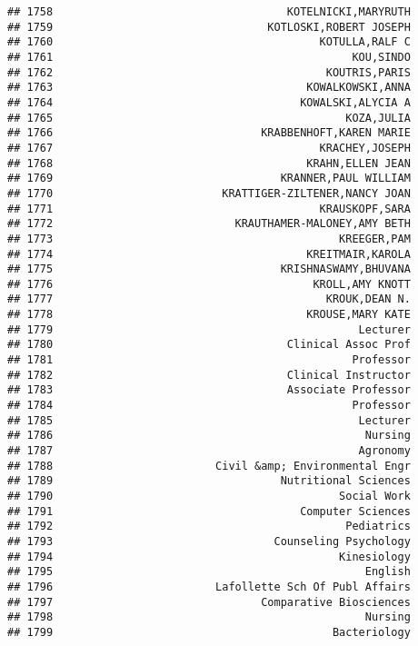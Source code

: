 \documentclass[
]{article}
\begin{document}
\begin{verbatim}
## 1758                                    KOTELNICKI,MARYRUTH
## 1759                                 KOTLOSKI,ROBERT JOSEPH
## 1760                                         KOTULLA,RALF C
## 1761                                              KOU,SINDO
## 1762                                          KOUTRIS,PARIS
## 1763                                       KOWALKOWSKI,ANNA
## 1764                                      KOWALSKI,ALYCIA A
## 1765                                             KOZA,JULIA
## 1766                                KRABBENHOFT,KAREN MARIE
## 1767                                         KRACHEY,JOSEPH
## 1768                                       KRAHN,ELLEN JEAN
## 1769                                   KRANNER,PAUL WILLIAM
## 1770                          KRATTIGER-ZILTENER,NANCY JOAN
## 1771                                         KRAUSKOPF,SARA
## 1772                            KRAUTHAMER-MALONEY,AMY BETH
## 1773                                            KREEGER,PAM
## 1774                                       KREITMAIR,KAROLA
## 1775                                   KRISHNASWAMY,BHUVANA
## 1776                                        KROLL,AMY KNOTT
## 1777                                          KROUK,DEAN N.
## 1778                                       KROUSE,MARY KATE
## 1779                                               Lecturer
## 1780                                    Clinical Assoc Prof
## 1781                                              Professor
## 1782                                    Clinical Instructor
## 1783                                    Associate Professor
## 1784                                              Professor
## 1785                                               Lecturer
## 1786                                                Nursing
## 1787                                               Agronomy
## 1788                         Civil &amp; Environmental Engr
## 1789                                   Nutritional Sciences
## 1790                                            Social Work
## 1791                                      Computer Sciences
## 1792                                             Pediatrics
## 1793                                  Counseling Psychology
## 1794                                            Kinesiology
## 1795                                                English
## 1796                         Lafollette Sch Of Publ Affairs
## 1797                                Comparative Biosciences
## 1798                                                Nursing
## 1799                                           Bacteriology

\end{verbatim}
\end{document}
